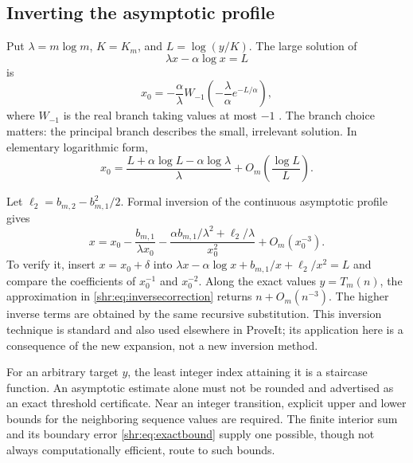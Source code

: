 \documentclass[11pt,letterpaper]{article}
\numberwithin{equation}{section}
\theoremstyle{definition}
\newcommand{\1}{\mathbf 1}
\begin{document}
\subsection{Inverting the asymptotic profile}
Put $\lambda=m\log m$, $K=K_m$, and $L=\log(y/K)$. The large solution of
\[
 \lambda x-\alpha\log x=L
\]
is
\begin{equation}
 x_0=-\frac\alpha\lambda
 W_{-1}\!\left(-\frac\lambda\alpha e^{-L/\alpha}\right),
 \label{shr:eq:inverseW}
\end{equation}
where $W_{-1}$ is the real branch taking values at most $-1$
\cite{DLMFW}. The branch choice matters: the principal branch describes
the small, irrelevant solution. In elementary logarithmic form,
\begin{equation}
 x_0=\frac{L+\alpha\log L-\alpha\log\lambda}{\lambda}
 +O_m\left(\frac{\log L}{L}\right).
\end{equation}

Let $\ell_2=b_{m,2}-b_{m,1}^2/2$. Formal inversion of the continuous
asymptotic profile gives
\begin{equation}
 x=x_0-\frac{b_{m,1}}{\lambda x_0}
 -\frac{\alpha b_{m,1}/\lambda^2+\ell_2/\lambda}{x_0^2}
 +O_m(x_0^{-3}).
 \label{shr:eq:inversecorrection}
\end{equation}
To verify it, insert $x=x_0+\delta$ into
$\lambda x-\alpha\log x+b_{m,1}/x+\ell_2/x^2=L$ and compare the
coefficients of $x_0^{-1}$ and $x_0^{-2}$.
Along the exact values $y=T_m(n)$, the approximation in
\eqref{shr:eq:inversecorrection} returns $n+O_m(n^{-3})$.
The higher inverse terms are obtained by the same recursive substitution.
This inversion technique is standard and also used elsewhere in ProveIt;
its application here is a consequence of the new expansion, not a new
inversion method.

For an arbitrary target $y$, the least integer index attaining it is a
staircase function. An asymptotic estimate alone must not be rounded and
advertised as an exact threshold certificate. Near an integer transition,
explicit upper and lower bounds for the neighboring sequence values are
required. The finite interior sum and its boundary error
\eqref{shr:eq:exactbound} supply one possible, though not always computationally
efficient, route to such bounds.
\end{document}
